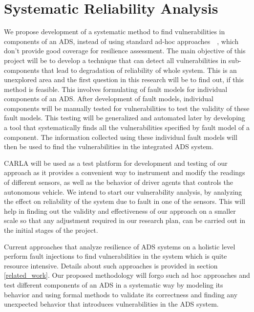 \section{Systematic Reliability Analysis}
We propose development of a systematic method to find vulnerabilities in components of an ADS, instead of using standard ad-hoc approaches~\cite{jha18dsn}~\cite{jha18art}, which don't provide good coverage for resilience assessment. The main objective of this project will be to develop a technique that can detect all vulnerabilities in sub-components that lead to degradation of reliability of whole system. This is an unexplored area and the first question in this research will be to find out, if this method is feasible. This involves formulating of fault models for individual components of an ADS. After development of fault models, individual components will be manually tested for vulnerabilities to test the validity of these fault models. This testing will be generalized and automated later by developing a tool that systematically finds all the vulnerabilities specified by fault model of a component. The information collected using these individual fault models will then be used to find the vulnerabilities in the integrated ADS system.

CARLA will be used as a test platform for development and testing of our approach as it provides a convenient way to instrument and modify the readings of different sensors, as well as the behavior of driver agents that controls the autonomous vehicle. We intend to start our vulnerability analysis, by analyzing the effect on reliability of the system due to fault in one of the sensors. This will help in finding out the validity and effectiveness of our approach on a smaller scale so that any adjustment required in our research plan, can be carried out in the initial stages of the project. 

Current approaches that analyze resilience of ADS systems on a holistic level perform fault injections to find vulnerabilities in the system which is quite resource intensive. Details about such approaches is provided in section \ref{related_work}. Our proposed methodology will forgo such ad hoc approaches and test different components of an ADS in a systematic way by modeling its behavior and using formal methods to validate its correctness and finding any unexpected behavior that introduces vulnerabilities in the ADS system. 